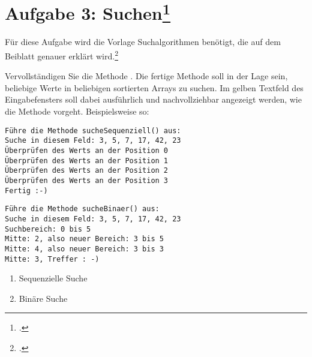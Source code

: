 \documentclass{lehramt-informatik-aufgabe}
\begin{document}

\section{Aufgabe 3: Suchen\footcite{aud:ab:2}}

Für diese Aufgabe wird die Vorlage Suchalgorithmen benötigt, die auf dem
Beiblatt genauer erklärt wird.\footcite{Diese Aufgabe stammt aus dem
Übungsblatt 1 zu Algorithmen und Datenstrukturen von Prof. Dr. Martin
Hennecke und Rainer Gall an der Universität Würzburg und wurde
dankenswerterweise zur Verwendung in diesem Aufgabenblatt zur Verfügung
gestellt.}

Vervollständigen Sie die Methode . Die fertige
Methode soll in der Lage sein, beliebige Werte in beliebigen sortierten
Arrays zu suchen. Im gelben Textfeld des Eingabefensters soll dabei
ausführlich und nachvollziehbar angezeigt werden, wie die Methode
vorgeht. Beispielsweise so:

{
\tiny
\begin{multicols}{2}
\begin{verbatim}
Führe die Methode sucheSequenziell() aus:
Suche in diesem Feld: 3, 5, 7, 17, 42, 23
Überprüfen des Werts an der Position 0
Überprüfen des Werts an der Position 1
Überprüfen des Werts an der Position 2
Überprüfen des Werts an der Position 3
Fertig :-)
\end{verbatim}

\begin{verbatim}
Führe die Methode sucheBinaer() aus:
Suche in diesem Feld: 3, 5, 7, 17, 42, 23
Suchbereich: 0 bis 5
Mitte: 2, also neuer Bereich: 3 bis 5
Mitte: 4, also neuer Bereich: 3 bis 3
Mitte: 3, Treffer : -)
\end{verbatim}
\end{multicols}
}

\begin{enumerate}
\item Sequenzielle Suche
\begin{antwort}
\end{antwort}

\item Binäre Suche

\begin{antwort}
\end{antwort}

\end{enumerate}
\end{document}
